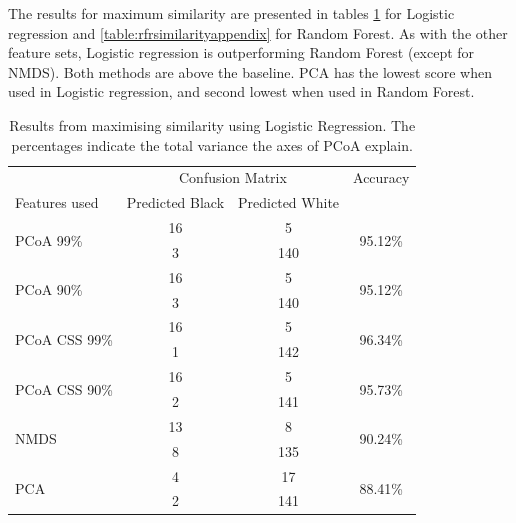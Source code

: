 The results for maximum similarity are presented in tables \ref{table:lrsimilarityappendix} for Logistic regression and \ref{table:rfrsimilarityappendix} for Random Forest. As with the other feature sets, Logistic regression is outperforming Random Forest (except for NMDS). Both methods are above the baseline. PCA has the lowest score when used in Logistic regression, and second lowest when used in Random Forest.
\begin{table}[h]
	\centering
	\begin{tabular}{l c  c c}
		\toprule
		&\multicolumn{2}{c}{Confusion Matrix} & Accuracy\\
		Features used & Predicted Black&Predicted White&\\
		\midrule
		\multirow{2}{*}{PCoA 99\%} &16 &5&\multirow{2}{*}{95.12\%}\\
		&	 3&140&\\
		\cmidrule{2-3}
		\multirow{2}{*}{PCoA 90\%} &16 &5&\multirow{2}{*}{95.12\%}\\
		&	 3&140&\\
		\cmidrule{2-3}
		\multirow{2}{*}{PCoA CSS 99\%} &16 &5&\multirow{2}{*}{96.34\%}\\
		&	 1&142&\\
		\cmidrule{2-3}
		\multirow{2}{*}{PCoA CSS 90\%} &16 &5&\multirow{2}{*}{95.73\%}\\
		&	 2&141&\\
		\cmidrule{2-3}
		\multirow{2}{*}{NMDS}&13 &8&\multirow{2}{*}{90.24\%}\\
		&	 8&135&\\
				\cmidrule{2-3}
		\multirow{2}{*}{PCA}&4 &17&\multirow{2}{*}{88.41\%}\\
		&	 2&141&\\
		\bottomrule
	\end{tabular}
	\caption{Results from maximising similarity using Logistic Regression. The percentages indicate the total variance the axes of PCoA explain.}
	\label{table:lrsimilarityappendix}
\end{table}


